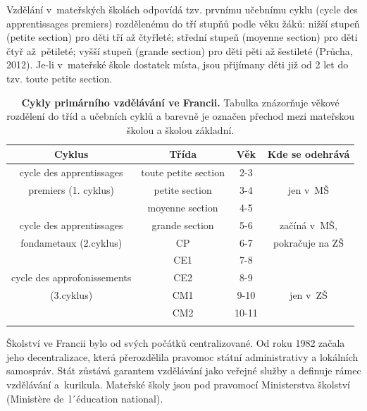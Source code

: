 		Vzdělání v mateřských školách odpovídá tzv. prvnímu učebnímu cyklu (cycle des apprentissages premiers) rozdělenému do tří stupňů podle věku žáků: nižší stupeň (petite section) pro děti tří až čtyřleté; střední stupeň (moyenne section) pro děti čtyř až pětileté; vyšší stupeň (grande section) pro děti pěti až šestileté
		(Průcha, 2012). 
		Je-li v~mateřské škole dostatek místa, jsou přijímany děti již od 2 let do tzv. toute petite section. 

\begin{spacing}{1.0}
\begin{table}[h]
	\center
	\small
	\begin{center}
	\begin{tabular}{|c|ccc|}
		\hline
		\rowcolor{grey}
		\textbf{Cyklus}				& \textbf{Třída}		& \textbf{Věk}	& \textbf{Kde se odehrává}	\\
		\hline
		\hline
		\rowcolor{grey!10}
	\cellcolor{white} cycle des apprentissages	& toute petite section 	& 2-3 		&				\\ \rowcolor{grey!20}
	\cellcolor{white} premiers (1. cyklus)		& petite section 		& 3-4 		& jen v~MŠ 		\\ \rowcolor{grey!20}
	\cellcolor{white}							& moyenne section 		& 4-5 		& 				\\ \rowcolor{grey!20}
		\hline
	\cellcolor{white} cycle des apprentissages 	& grande section 		& 5-6 		& začíná v~MŠ, 		\\ \rowcolor{grey!50}
	\cellcolor{white} fondametaux (2.cyklus) 		& CP 					& 6-7 		& pokračuje na ZŠ 	\\ \rowcolor{grey!50}
	\cellcolor{white}								& CE1 					& 7-8 		& 					\\ \rowcolor{grey!50}
		\hline
	\cellcolor{white} cycle des approfonissements & CE2 					& 8-9 		&					\\ \rowcolor{grey!50}
	\cellcolor{white} (3.cyklus)					& CM1 					& 9-10 		& jen v~ZŠ 			\\ \rowcolor{grey!50}
	\cellcolor{white}								& CM2 					& 10-11 	& 					\\ \rowcolor{grey!50}
		\hline
	\end{tabular}
	\end{center}
	\caption{ \textbf{Cykly primárního vzdělávání ve Francii.} Tabulka znázorňuje věkové rozdělení do tříd a učebních cyklů a barevně je označen přechod mezi mateřskou školou a školou základní. 
	}
	\label{tab:rozdeleniTridFR}
\end{table}
\end{spacing}
		Školství ve Francii bylo od svých počátků centralizované. Od roku 1982 začala jeho decentralizace, která přerozdělila pravomoc státní administrativy a lokálních samospráv. Stát zůstává garantem vzdělávání jako veřejné služby a definuje rámec vzdělávání a kurikula. Mateřské školy jsou pod pravomocí Ministerstva školství (Ministère de l´éducation national).


